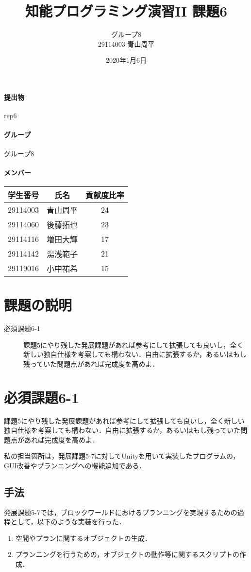\documentclass[12pt]{jarticle}
\title{知能プログラミング演習II 課題6}
\author{グループ8\\
  29114003 青山周平\\
}
\date{2020年1月6日}
\begin{document}
\maketitle

\paragraph{提出物} rep6
\paragraph{グループ} グループ8
\paragraph{メンバー}
\begin{tabular}{|c|c|c|}
  \hline
  学生番号&氏名&貢献度比率\\
  \hline\hline
  29114003&青山周平&24\\
  \hline
  29114060&後藤拓也&23\\
  \hline
  29114116&増田大輝&17\\
  \hline
  29114142&湯浅範子&21\\
  \hline
  29119016&小中祐希&15\\
  \hline
\end{tabular}

\section{課題の説明}
\begin{description}
\item[必須課題6-1] 課題5にやり残した発展課題があれば参考にして拡張しても良いし，全く新しい独自仕様を考案しても構わない．自由に拡張するか，あるいはもし残っていた問題点があれば完成度を高めよ．
\end{description}

\section{必須課題6-1}
\begin{screen}
課題5にやり残した発展課題があれば参考にして拡張しても良いし，全く新しい独自仕様を考案しても構わない．自由に拡張するか，あるいはもし残っていた問題点があれば完成度を高めよ．
\end{screen}
私の担当箇所は，発展課題5-7に対してUnityを用いて実装したプログラムの，GUI改善やプランニングへの機能追加である．

\subsection{手法}
発展課題5-7では，ブロックワールドにおけるプランニングを実現するための過程として，以下のような実装を行った．
\begin{enumerate}
\item 空間やプランに関するオブジェクトの生成．
\item プランニングを行うための，オブジェクトの動作等に関するスクリプトの作成．
\end{enumerate}
\end{document}
